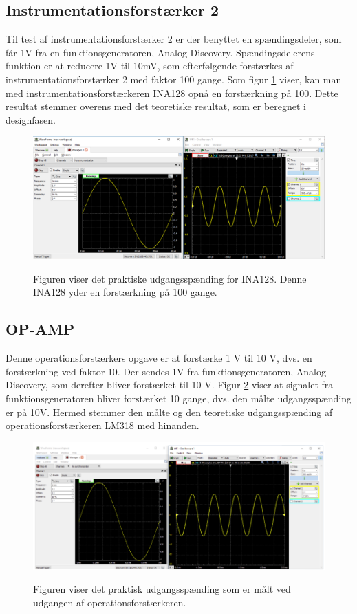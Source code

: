 \subsection{Instrumentationsforstærker 2}

Til test af instrumentationsforstærker 2 er der benyttet en spændingsdeler, som får 1V fra en funktionsgeneratoren, Analog Discovery. Spændingsdelerens funktion er at reducere 1V til 10mV, som efterfølgende forstærkes af instrumentationsforstærker 2 med faktor 100 gange. Som figur \ref{TestAfINA1282} viser, kan man med instrumentationsforstærkeren INA128 opnå en forstærkning på 100. Dette resultat stemmer overens med det teoretiske resultat, som er beregnet i designfasen.  

\begin{figure}[H] 
\centering
{\includegraphics[width=12cm]
{Figure/TestAfINA1282.PNG}}
\caption{Figuren viser det praktiske udgangsspænding for INA128. Denne INA128 yder en forstærkning på 100 gange.}
\label{TestAfINA1282}
\end{figure}






\subsection{OP-AMP}

Denne operationsforstærkers opgave er at forstærke 1 V til 10 V, dvs. en forstærkning ved faktor 10. Der sendes 1V fra funktionsgeneratoren, Analog Discovery, som derefter bliver forstærket til 10 V. Figur \ref{TestAfOpAmp} viser at signalet fra funktionsgeneratoren bliver forstærket 10 gange, dvs. den målte udgangsspænding er på 10V. Hermed stemmer den målte og den teoretiske udgangsspænding af operationsforstærkeren LM318 med hinanden.  

\begin{figure}[H] 
\centering
{\includegraphics[width=14cm]
{Figure/TestOpamp.PNG}}
\caption{Figuren viser det praktisk udgangsspænding som er målt ved udgangen af operationsforstærkeren.}
\label{TestAfOpAmp}
\end{figure}



